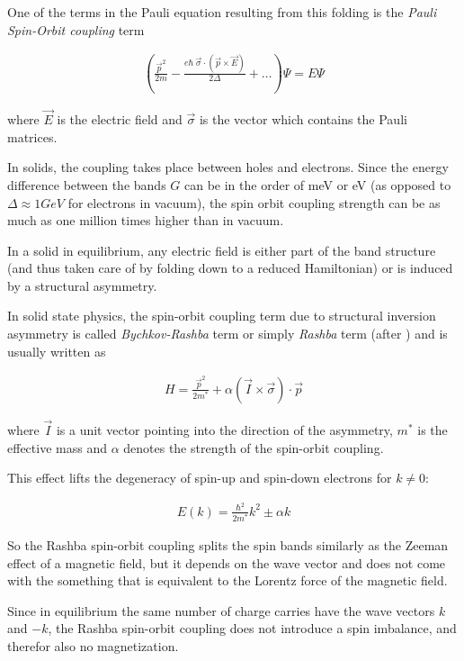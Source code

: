 \documentclass[11pt,twoside]{book}
\newcommand{\inp}[1]{\ensuremath{\left(#1\right)}}
\begin{document}
One of the terms in the Pauli equation resulting from this folding is the
\emph{Pauli Spin-Orbit coupling} term \cite{winkler2003}

\begin{align}
    \left( \frac{\vec p^2}{2m}- \frac{e\hbar \ \vec\sigma \cdot (\vec p \times \vec E)}
                    {2\Delta} +\ldots\right)\Psi = E \Psi
\end{align}

where $\vec E$ is the electric field and $\vec \sigma$ is the vector
which contains the Pauli matrices.

In solids, the coupling takes place between holes and electrons. Since the
energy difference between the bands $G$ can be in the order of meV or eV
(as opposed to $\Delta \approx 1GeV$ for electrons in vacuum), the spin orbit
coupling strength can be as much as one million times higher
than in vacuum.

In a solid in equilibrium, any electric field is either part of the band
structure (and thus taken care of by folding down to a reduced Hamiltonian)
or is induced by a structural asymmetry.

In solid state physics, the spin-orbit coupling term due to structural
inversion asymmetry is called \emph{Bychkov-Rashba} term or simply
\emph{Rashba} term (after \cite{rashba}) and is usually written as

\begin{align}
    H = \frac{\vec p ^2}{2m^*} + \alpha \inp{\vec I \times  \vec \sigma} \cdot \vec p
\end{align}

where $\vec I$ is a unit vector pointing into the direction of the asymmetry,
$m^*$ is the effective mass
and $\alpha$ denotes the strength of the spin-orbit coupling.

This effect lifts the degeneracy of spin-up and spin-down electrons for
$k \not= 0$:

\begin{align}
    E(k) = \frac{\hbar^2}{2 m^*} k^2 \pm \alpha k
\end{align}

So the Rashba spin-orbit coupling splits the spin bands similarly as the Zeeman
effect of a
magnetic field, but it depends on the wave vector and does not come with the
something that is equivalent to the Lorentz force of the magnetic field.

Since in equilibrium the same number of charge carries have the wave vectors
$k$ and $-k$, the Rashba spin-orbit coupling does not introduce a spin
imbalance, and therefor also no magnetization.
\end{document}
